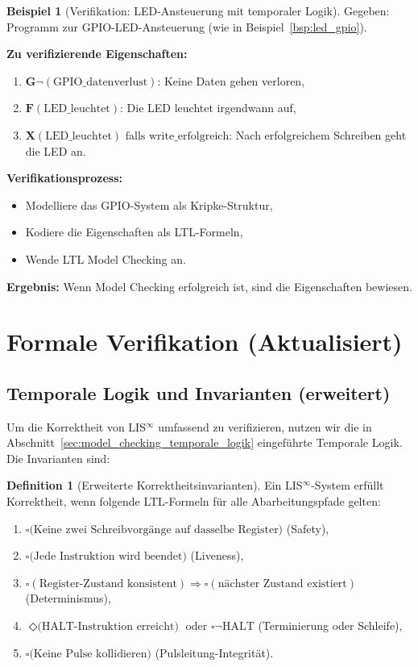 \documentclass[a4paper,12pt]{article}
\theoremstyle{definition}
\newtheorem{definition}{Definition}
\newtheorem{beispiel}{Beispiel}
\begin{document}
	\begin{beispiel}[Verifikation: LED-Ansteuerung mit temporaler Logik]
		\label{bsp:verify_led}
		Gegeben: Programm zur GPIO-LED-Ansteuerung (wie in Beispiel~\ref{bsp:led_gpio}).
		
		\textbf{Zu verifizierende Eigenschaften:}
		\begin{enumerate}
			\item $\mathbf{G}\neg(\text{GPIO\_datenverlust})$: Keine Daten gehen verloren,
			\item $\mathbf{F}(\text{LED\_leuchtet})$: Die LED leuchtet irgendwann auf,
			\item $\mathbf{X}(\text{LED\_leuchtet}) \text{ falls } \text{write\_erfolgreich}$: Nach erfolgreichem Schreiben geht die LED an.
		\end{enumerate}
		
		\textbf{Verifikationsprozess:}
		\begin{itemize}
			\item Modelliere das GPIO-System als Kripke-Struktur,
			\item Kodiere die Eigenschaften als LTL-Formeln,
			\item Wende LTL Model Checking an.
		\end{itemize}
		
		\textbf{Ergebnis:} Wenn Model Checking erfolgreich ist, sind die Eigenschaften bewiesen.
	\end{beispiel}
	
	\section{Formale Verifikation (Aktualisiert)}
	\label{sec:formale_verifikation}
	
	\subsection{Temporale Logik und Invarianten (erweitert)}
	
	Um die Korrektheit von LIS$^{\infty}$ umfassend zu verifizieren, nutzen wir die in Abschnitt~\ref{sec:model_checking_temporale_logik} eingeführte Temporale Logik. Die Invarianten sind:
	
	\begin{definition}[Erweiterte Korrektheitsinvarianten]
		Ein LIS$^{\infty}$-System erfüllt Korrektheit, wenn folgende LTL-Formeln für alle Abarbeitungspfade gelten:
		\begin{enumerate}
			\item $\square \text{(Keine zwei Schreibvorgänge auf dasselbe Register)}$ (Safety),
			\item $\square \text{(Jede Instruktion wird beendet)}$ (Liveness),
			\item $\square (\text{Register-Zustand konsistent}) \Rightarrow \square (\text{nächster Zustand existiert})$ (Determinismus),
			\item $\Diamond \text{(HALT-Instruktion erreicht)}$ oder $\square \neg \text{HALT}$ (Terminierung oder Schleife),
			\item $\square \text{(Keine Pulse kollidieren)}$ (Pulsleitung-Integrität).
		\end{enumerate}
	\end{definition}
	
\end{document}
